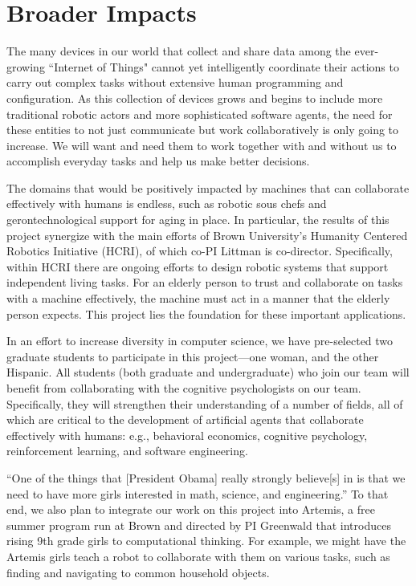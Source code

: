
\section{Broader Impacts}

The many devices in our world that collect and share data among the
ever-growing ``Internet of Things" cannot yet intelligently coordinate
their actions to carry out complex tasks without extensive human
programming and configuration.  As this collection of devices grows
and begins to include more traditional robotic actors and more
sophisticated software agents, the need for these entities to not just
communicate but work collaboratively is only going to increase.  We
will want and need them to work together with and without us to
accomplish everyday tasks and help us make better decisions.

The domains that would be positively impacted by machines
that can collaborate effectively with humans is endless, such as robotic sous chefs and
gerontechnological support for aging in place.
%
In particular, the results of this project synergize with the main efforts of 
Brown University's Humanity Centered Robotics Initiative (HCRI), of
which co-PI Littman is co-director. Specifically, within HCRI there
are ongoing efforts to design robotic systems that support independent
living tasks. For an elderly person to trust and collaborate on tasks with a machine effectively, the machine must act in a manner that the elderly person expects. This project lies the foundation for these important applications.

In an effort to increase diversity in computer science, we have
pre-selected two graduate students to participate in this
project---one woman, and the other Hispanic.  All students (both
graduate and undergraduate) who join our team will benefit from collaborating with the cognitive psychologists on our team.
Specifically, they will strengthen their understanding of a number of
fields, all of which are critical to the development of artificial
agents that collaborate effectively with humans: e.g., behavioral
economics, cognitive psychology, reinforcement learning, and software
engineering.

``One of the things that [President Obama] really strongly believe[s]
in is that we need to have more girls interested in math, science, and
engineering.''  To that end, we also plan to integrate our work on
this project into Artemis, a free summer program run at Brown and
directed by PI Greenwald that introduces rising 9th grade girls to
computational thinking.
For example, we might have the Artemis girls teach a robot to
collaborate with them on various tasks, such as finding and navigating
to common household objects.

